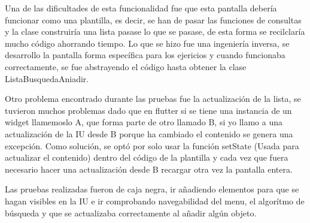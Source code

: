 Una de las dificultades de esta funcionalidad fue que esta pantalla debería funcionar como una plantilla, es decir, se han de pasar las funciones de consultas y la clase construiría una lista pasase lo que se pasase, de esta forma se recilclaría mucho código ahorrando tiempo. Lo que se hizo fue una ingeniería inversa, se desarrollo la pantalla forma específica para los ejericios y cuando funcionaba correctamente, se fue abstrayendo el código hasta obtener la clase ListaBusquedaAniadir.

Otro problema encontrado durante las pruebas fue la actualización de la lista, se tuvieron muchos problemas dado que en flutter si se tiene una instancia de un widget llamemoslo A, que forma parte de otro llamado B, si yo llamo a una actualización de la IU desde B porque ha cambiado el contenido se genera una excepción. Como solución, se optó por solo usar la función setState (Usada para actualizar el contenido) dentro del código de la plantilla y cada vez que fuera necesario hacer una actualización desde B recargar otra vez la pantalla entera.

Las pruebas realizadas fueron de caja negra, ir añadiendo elementos para que se hagan visibles en la IU e ir comprobando navegabilidad del menu, el algorítmo de búsqueda y que se actualizaba correctamente al añadir algún objeto.



